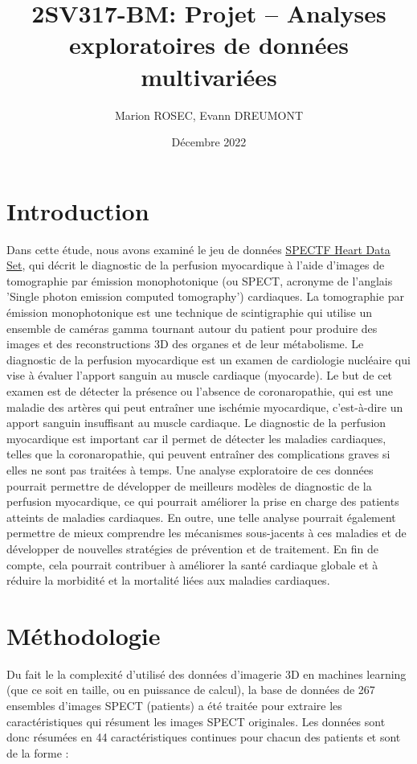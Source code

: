 \documentclass{NewTeX}
\title{2SV317-BM: Projet -- Analyses exploratoires de données multivariées}
\author{Marion ROSEC, Evann DREUMONT}
\date{Décembre 2022}
\begin{document}
    \maketitle


    \section{Introduction}\label{sec:introduction}

    Dans cette étude, nous avons examiné le jeu de données \href{https://archive.ics.uci.edu/ml/datasets/SPECTF+Heart}{SPECTF Heart Data Set}, qui décrit le diagnostic de la perfusion myocardique à l'aide d'images de tomographie par émission monophotonique (ou SPECT, acronyme de l'anglais 'Single photon emission computed tomography') cardiaques.
    La tomographie par émission monophotonique est une technique de scintigraphie qui utilise un ensemble de caméras gamma tournant autour du patient pour produire des images et des reconstructions 3D des organes et de leur métabolisme.
    Le diagnostic de la perfusion myocardique est un examen de cardiologie nucléaire qui vise à évaluer l'apport sanguin au muscle cardiaque (myocarde).
    Le but de cet examen est de détecter la présence ou l'absence de coronaropathie, qui est une maladie des artères qui peut entraîner une ischémie myocardique, c'est-à-dire un apport sanguin insuffisant au muscle cardiaque.
    Le diagnostic de la perfusion myocardique est important car il permet de détecter les maladies cardiaques, telles que la coronaropathie, qui peuvent entraîner des complications graves si elles ne sont pas traitées à temps.
    Une analyse exploratoire de ces données pourrait permettre de développer de meilleurs modèles de diagnostic de la perfusion myocardique, ce qui pourrait améliorer la prise en charge des patients atteints de maladies cardiaques.
    En outre, une telle analyse pourrait également permettre de mieux comprendre les mécanismes sous-jacents à ces maladies et de développer de nouvelles stratégies de prévention et de traitement.
    En fin de compte, cela pourrait contribuer à améliorer la santé cardiaque globale et à réduire la morbidité et la mortalité liées aux maladies cardiaques.


    \section{Méthodologie}\label{sec:methodologie}

    Du fait le la complexité d'utilisé des données d'imagerie 3D en machines learning (que ce soit en taille, ou en puissance de calcul), la base de données de 267 ensembles d'images SPECT (patients) a été traitée pour extraire les caractéristiques qui résument les images SPECT originales.
    Les données sont donc résumées en 44 caractéristiques continues pour chacun des patients et sont de la forme :
\end{document}
